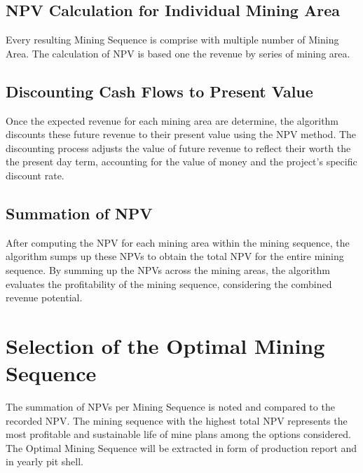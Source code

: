\documentclass[12pt]{report}
\begin{document}
\subsection{NPV Calculation for Individual Mining Area}

Every resulting Mining Sequence is comprise with multiple number of Mining Area.
The calculation of NPV is based one the revenue by series of mining area.

\subsection{Discounting Cash Flows to Present Value}

Once the expected revenue for each mining area are determine, the algorithm discounts these future revenue to their present value using the NPV method.
The discounting process adjusts the value of future revenue to reflect their worth the the present day term, accounting for the value of money and the project’s specific discount rate.

\subsection{Summation of NPV}

After computing the NPV for each mining area within the mining sequence, the algorithm sumps up these NPVs to obtain the total NPV for the entire mining sequence.
By summing up the NPVs across the mining areas, the algorithm evaluates the profitability of the mining sequence, considering the combined revenue potential.

\section{Selection of the Optimal Mining Sequence}

The summation of NPVs per Mining Sequence is noted and compared to the recorded NPV.
The mining sequence with the highest total NPV represents the most profitable and sustainable life of mine plans among the options considered.
The Optimal Mining Sequence will be extracted in form of production report and in yearly pit shell.

\printbibliography[
    title = {REFERENCES},
    heading = bibintoc
]
\end{document}

